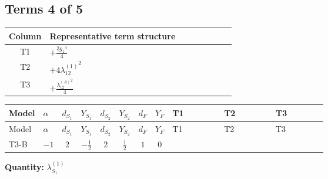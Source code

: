 \documentclass[8pt]{article}
\begin{document}
\begin{landscape}
\subsection*{Terms 4 of 5}
\begin{center}
\begin{tabular}{@{}c >{\raggedright\arraybackslash}p{0.82\linewidth}@{}}
\toprule
Column & Representative term structure \\
\midrule
T1 & \(\displaystyle +\frac{3 {g_1}^4}{4}\) \\
\midrule
T2 & \(\displaystyle +4 {\lambda_{12}^{(1)}}^2\) \\
\midrule
T3 & \(\displaystyle +\frac{{\lambda_{12}^{(A)}}^2}{4}\) \\
\midrule
\bottomrule
\end{tabular}
\end{center}
\smallskip
\tiny
\begin{longtable}{@{}llcccccc >{\raggedright\arraybackslash}p{0.21\linewidth} >{\raggedright\arraybackslash}p{0.21\linewidth} >{\raggedright\arraybackslash}p{0.21\linewidth}@{}}
\toprule
Model & $\alpha$ & $d_{S_1}$ & $Y_{S_1}$ & $d_{S_2}$ & $Y_{S_2}$ & $d_F$ & $Y_F$ & T1 & T2 & T3 \\
\midrule
\endfirsthead
\toprule
Model & $\alpha$ & $d_{S_1}$ & $Y_{S_1}$ & $d_{S_2}$ & $Y_{S_2}$ & $d_F$ & $Y_F$ & T1 & T2 & T3 \\
\midrule
\endhead
T3-B & $-1$ & $2$ & $-\frac{1}{2}$ & $2$ & $\frac{1}{2}$ & $1$ & $0$ & \scriptsize\adjustbox{max width=\linewidth}{$\begin{gathered} +\frac{3 {g_1}^4}{4}\end{gathered}$} & \scriptsize\adjustbox{max width=\linewidth}{$\begin{gathered} +4 {\lambda_{12}^{(1)}}^2\end{gathered}$} & \scriptsize\adjustbox{max width=\linewidth}{$\begin{gathered} +\frac{{\lambda_{12}^{(A)}}^2}{4}\end{gathered}$} \\
\midrule
\bottomrule
\end{longtable}
\clearpage
\noindent\textbf{Quantity: }$\lambda_{S_1}^{(1)}$\par\smallskip

\end{landscape}
\end{document}
